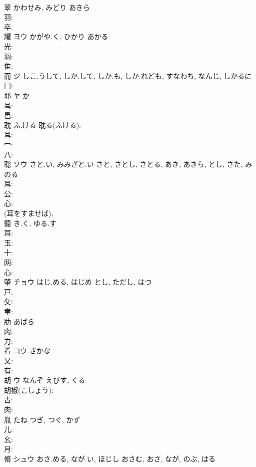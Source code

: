\documentclass[8pt]{extreport}
\begin{document}
\begin{CJK}{UTF8}{min}
\\	翠		かわせみ, みどり	あきら			
\\	羽: 
\\	卒: 
\\	耀	ヨウ	かがや.く, ひかり	あかる	
\\	光: 
\\	羽: 
\\	隹: 
\\	而	ジ	しこ.うして, しか.して, しか.も, しか.れども, すなわち, なんじ, しかるに		
\\	冂: 
\\	耶	ヤ	か		
\\	耳: 
\\	邑: 
\\	耽		ふ.ける			耽る(ふける): 
\\	耳: 
\\	冖: 
\\	八: 
\\	聡	ソウ	さと.い, みみざと.い	さと, さとし, さとる, あき, あきら, とし, さた, みのる	
\\	耳: 
\\	公: 
\\	心: 
\\	(耳をすませば), 
\\	聽		き.く, ゆる.す				
\\	耳: 
\\	玉: 
\\	十: 
\\	网: 
\\	心: 
\\	肇	チョウ	はじ.める, はじめ	とし, ただし, はつ	
\\	戸: 
\\	攵: 
\\	聿: 
\\	肋		あばら				
\\	肉: 
\\	力: 
\\	肴	コウ	さかな		
\\	乂: 
\\	有: 
\\	胡	ウ	なんぞ	えびす, くる	
\\	胡椒(こしょう): 
\\	古: 
\\	肉: 
\\	胤		たね	つぎ, つぐ, かず			
\\	儿: 
\\	幺: 
\\	月: 
\\	脩	シュウ	おさ.める, なが.い, ほじし	おさむ, おさ, なが, のぶ, はる	

\end{CJK}
\end{document}
